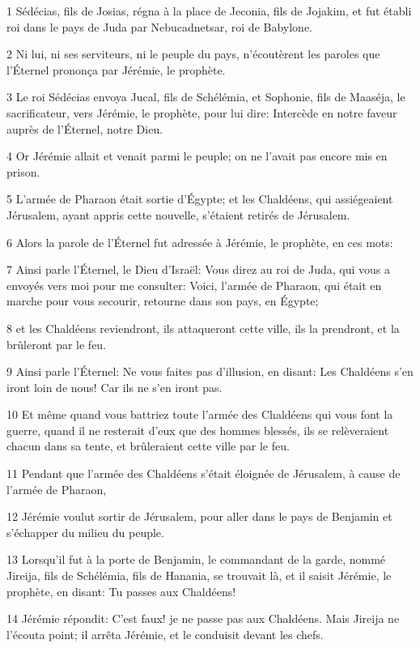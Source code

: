 \par 1 Sédécias, fils de Josias, régna à la place de Jeconia, fils de Jojakim, et fut établi roi dans le pays de Juda par Nebucadnetsar, roi de Babylone.
\par 2 Ni lui, ni ses serviteurs, ni le peuple du pays, n'écoutèrent les paroles que l'Éternel prononça par Jérémie, le prophète.
\par 3 Le roi Sédécias envoya Jucal, fils de Schélémia, et Sophonie, fils de Maaséja, le sacrificateur, vers Jérémie, le prophète, pour lui dire: Intercède en notre faveur auprès de l'Éternel, notre Dieu.
\par 4 Or Jérémie allait et venait parmi le peuple; on ne l'avait pas encore mis en prison.
\par 5 L'armée de Pharaon était sortie d'Égypte; et les Chaldéens, qui assiégeaient Jérusalem, ayant appris cette nouvelle, s'étaient retirés de Jérusalem.
\par 6 Alors la parole de l'Éternel fut adressée à Jérémie, le prophète, en ces mots:
\par 7 Ainsi parle l'Éternel, le Dieu d'Israël: Vous direz au roi de Juda, qui vous a envoyés vers moi pour me consulter: Voici, l'armée de Pharaon, qui était en marche pour vous secourir, retourne dans son pays, en Égypte;
\par 8 et les Chaldéens reviendront, ils attaqueront cette ville, ils la prendront, et la brûleront par le feu.
\par 9 Ainsi parle l'Éternel: Ne vous faites pas d'illusion, en disant: Les Chaldéens s'en iront loin de nous! Car ils ne s'en iront pas.
\par 10 Et même quand vous battriez toute l'armée des Chaldéens qui vous font la guerre, quand il ne resterait d'eux que des hommes blessés, ils se relèveraient chacun dans sa tente, et brûleraient cette ville par le feu.
\par 11 Pendant que l'armée des Chaldéens s'était éloignée de Jérusalem, à cause de l'armée de Pharaon,
\par 12 Jérémie voulut sortir de Jérusalem, pour aller dans le pays de Benjamin et s'échapper du milieu du peuple.
\par 13 Lorsqu'il fut à la porte de Benjamin, le commandant de la garde, nommé Jireija, fils de Schélémia, fils de Hanania, se trouvait là, et il saisit Jérémie, le prophète, en disant: Tu passes aux Chaldéens!
\par 14 Jérémie répondit: C'est faux! je ne passe pas aux Chaldéens. Mais Jireija ne l'écouta point; il arrêta Jérémie, et le conduisit devant les chefs.
